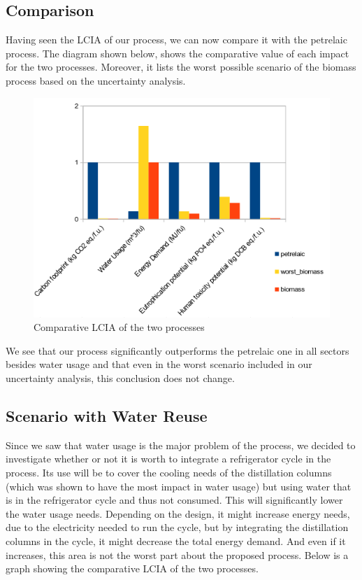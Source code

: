 \documentclass[11pt]{article}
\begin{document}
\pagebreak

\subsection{Comparison}
\label{sec:org6d3d0ef}
Having seen the LCIA of our process, we can now compare it with the petrelaic process. The diagram shown below, shows the comparative value of each impact for the two processes. Moreover, it lists the worst possible scenario of the biomass process based on the uncertainty analysis.

\begin{figure}[htbp]
\centering
\includegraphics[width=.6\linewidth]{Life_Cycle_Impact_Assessment/2024-01-06_16-23-27_screenshot.png}
\caption{Comparative LCIA of the two processes}
\end{figure}

\pagebreak

We see that our process significantly outperforms the petrelaic one in all sectors besides water usage and that even in the worst scenario included in our uncertainty analysis, this conclusion does not change.

\subsection{Scenario with Water Reuse}
\label{sec:orge869034}
Since we saw that water usage is the major problem of the process, we decided to investigate whether or not it is worth to integrate a refrigerator cycle in the process. Its use will be to cover the cooling needs of the distillation columns (which was shown to have the most impact in water usage) but using water that is in the refrigerator cycle and thus not consumed. This will significantly lower the water usage needs. Depending on the design, it might increase energy needs, due to the electricity needed to run the cycle, but by integrating the distillation columns in the cycle, it might decrease the total energy demand. And even if it increases, this area is not the worst part about the proposed process. Below is a graph showing the comparative LCIA of the two processes.
\end{document}
